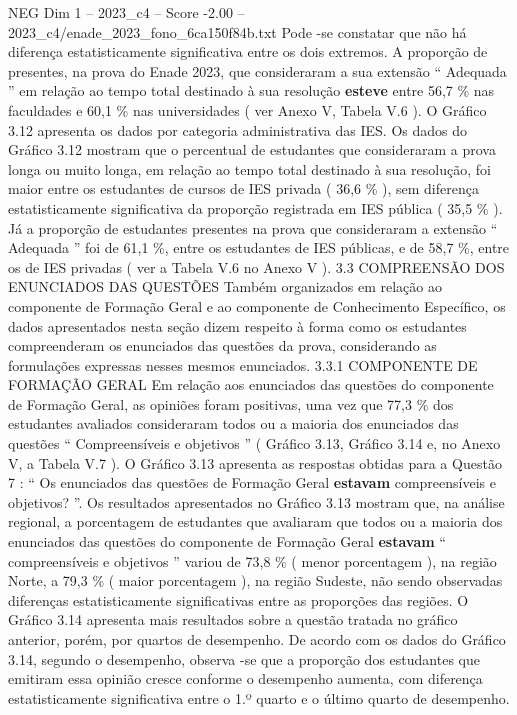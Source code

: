 \begin{textsample}{NEG Dim 1 – 2023\_c4 – Score -2.00 – 2023\_c4/enade\_2023\_fono\_6ca150f84b.txt}
Pode -se constatar que não há diferença estatisticamente significativa entre os dois extremos.
A proporção de presentes, na prova do Enade 2023, que consideraram a sua extensão “ Adequada ” em relação ao tempo total destinado à sua resolução \textbf{esteve} entre 56,7 \% nas faculdades e 60,1 \% nas universidades ( ver Anexo V, Tabela V.6 ).
O Gráfico 3.12 apresenta os dados por categoria administrativa das IES.
Os dados do Gráfico 3.12 mostram que o percentual de estudantes que consideraram a prova longa ou muito longa, em relação ao tempo total destinado à sua resolução, foi maior entre os estudantes de cursos de IES privada ( 36,6 \% ), sem diferença estatisticamente significativa da proporção registrada em IES pública ( 35,5 \% ).
Já a proporção de estudantes presentes na prova que consideraram a extensão “ Adequada ” foi de 61,1 \%, entre os estudantes de IES públicas, e de 58,7 \%, entre os de IES privadas ( ver a Tabela V.6 no Anexo V ). 3.3 COMPREENSÃO DOS ENUNCIADOS DAS QUESTÕES Também organizados em relação ao componente de Formação Geral e ao componente de Conhecimento Específico, os dados apresentados nesta seção dizem respeito à forma como os estudantes compreenderam os enunciados das questões da prova, considerando as formulações expressas nesses mesmos enunciados. 3.3.1 COMPONENTE DE FORMAÇÃO GERAL Em relação aos enunciados das questões do componente de Formação Geral, as opiniões foram positivas, uma vez que 77,3 \% dos estudantes avaliados consideraram todos ou a maioria dos enunciados das questões “ Compreensíveis e objetivos ” ( Gráfico 3.13, Gráfico 3.14 e, no Anexo V, a Tabela V.7 ).
O Gráfico 3.13 apresenta as respostas obtidas para a Questão 7 : “ Os enunciados das questões de Formação Geral \textbf{estavam} compreensíveis e objetivos? ”.
Os resultados apresentados no Gráfico 3.13 mostram que, na análise regional, a porcentagem de estudantes que avaliaram que todos ou a maioria dos enunciados das questões do componente de Formação Geral \textbf{estavam} “ compreensíveis e objetivos ” variou de 73,8 \% ( menor porcentagem ), na região Norte, a 79,3 \% ( maior porcentagem ), na região Sudeste, não sendo observadas diferenças estatisticamente significativas entre as proporções das regiões.
O Gráfico 3.14 apresenta mais resultados sobre a questão tratada no gráfico anterior, porém, por quartos de desempenho.
De acordo com os dados do Gráfico 3.14, segundo o desempenho, observa -se que a proporção dos estudantes que emitiram essa opinião cresce conforme o desempenho aumenta, com diferença estatisticamente significativa entre o 1.º quarto e o último quarto de desempenho.

\end{textsample}
